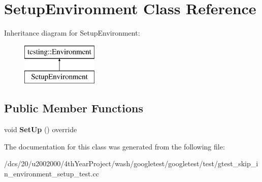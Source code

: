 \hypertarget{classSetupEnvironment}{}\section{Setup\+Environment Class Reference}
\label{classSetupEnvironment}
Inheritance diagram for Setup\+Environment\+:\begin{figure}[H]
\begin{center}
\leavevmode
\includegraphics[height=2.000000cm]{classSetupEnvironment}
\end{center}
\end{figure}
\subsection*{Public Member Functions}
\begin{DoxyCompactItemize}
\item 
\mbox{\label{classSetupEnvironment_a02995e3c2581a49c9dd0526d80072b38}} 
void {\bfseries Set\+Up} () override
\end{DoxyCompactItemize}


The documentation for this class was generated from the following file\+:\begin{DoxyCompactItemize}
\item 
/dcs/20/u2002000/4th\+Year\+Project/wash/googletest/googletest/test/gtest\+\_\+skip\+\_\+in\+\_\+environment\+\_\+setup\+\_\+test.\+cc\end{DoxyCompactItemize}
